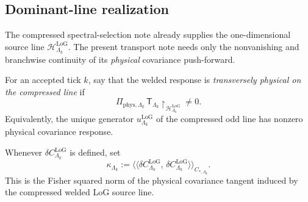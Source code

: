 \documentclass[11pt]{article}
\begin{document}
\subsection*{Dominant-line realization}
\label{subsec:dominant-line-realization}

The compressed spectral-selection note already supplies the one-dimensional source line
\(\mathcal H^{\mathrm{LoG}}_{\Lambda_k}\).
The present transport note needs only the nonvanishing and branchwise continuity of its
\emph{physical} covariance push-forward.

\begin{definition}
\label{def:compressed-line-transversality}
For an accepted tick \(k\), say that the welded response is \emph{transversely physical on the
compressed line} if
\begin{equation}
\Pi_{\mathrm{phys},\Lambda_k}\,\mathsf T_{\Lambda_k}\!\restriction_{\mathcal H^{\mathrm{LoG}}_{\Lambda_k}}
\neq 0.
\label{eq:compressed-transversality}
\end{equation}
Equivalently, the unique generator \(u^{\mathrm{LoG}}_{\Lambda_k}\) of the compressed odd line has
nonzero physical covariance response.
\end{definition}

\begin{definition}
\label{def:dominant-response-norm}
Whenever \(\delta C^{\mathrm{LoG}}_{\Lambda_k}\) is defined, set
\begin{equation}
\kappa_{\Lambda_k}
:=
\big\langle\!\big\langle
\delta C^{\mathrm{LoG}}_{\Lambda_k},\,
\delta C^{\mathrm{LoG}}_{\Lambda_k}
\big\rangle\!\big\rangle_{C_{\ast,\Lambda_k}}.
\label{eq:kappa-dom-def}
\end{equation}
This is the Fisher squared norm of the physical covariance tangent induced by the compressed welded
LoG source line.
\end{definition}
\end{document}
